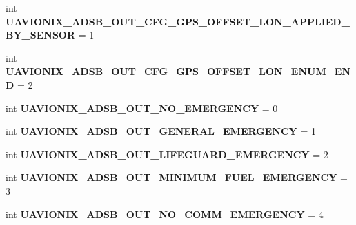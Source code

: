 \begin{DoxyCompactItemize}
\item 
\mbox{\label{namespacepymavlink_1_1dialects_1_1v10_acef78fcd3799630d3d422650b0805ff3}} 
int {\bfseries U\+A\+V\+I\+O\+N\+I\+X\+\_\+\+A\+D\+S\+B\+\_\+\+O\+U\+T\+\_\+\+C\+F\+G\+\_\+\+G\+P\+S\+\_\+\+O\+F\+F\+S\+E\+T\+\_\+\+L\+O\+N\+\_\+\+A\+P\+P\+L\+I\+E\+D\+\_\+\+B\+Y\+\_\+\+S\+E\+N\+S\+OR} = 1
\item 
\mbox{\label{namespacepymavlink_1_1dialects_1_1v10_a64ebfc328ccf04025fe31abab358d981}} 
int {\bfseries U\+A\+V\+I\+O\+N\+I\+X\+\_\+\+A\+D\+S\+B\+\_\+\+O\+U\+T\+\_\+\+C\+F\+G\+\_\+\+G\+P\+S\+\_\+\+O\+F\+F\+S\+E\+T\+\_\+\+L\+O\+N\+\_\+\+E\+N\+U\+M\+\_\+\+E\+ND} = 2
\item 
\mbox{\label{namespacepymavlink_1_1dialects_1_1v10_ac1f6b9dd7e0ba0b31433747322f29c20}} 
int {\bfseries U\+A\+V\+I\+O\+N\+I\+X\+\_\+\+A\+D\+S\+B\+\_\+\+O\+U\+T\+\_\+\+N\+O\+\_\+\+E\+M\+E\+R\+G\+E\+N\+CY} = 0
\item 
\mbox{\label{namespacepymavlink_1_1dialects_1_1v10_a76b759dd2eb10db602caa9d817833373}} 
int {\bfseries U\+A\+V\+I\+O\+N\+I\+X\+\_\+\+A\+D\+S\+B\+\_\+\+O\+U\+T\+\_\+\+G\+E\+N\+E\+R\+A\+L\+\_\+\+E\+M\+E\+R\+G\+E\+N\+CY} = 1
\item 
\mbox{\label{namespacepymavlink_1_1dialects_1_1v10_a82cf2057311f51b29bd3e5f69e49658b}} 
int {\bfseries U\+A\+V\+I\+O\+N\+I\+X\+\_\+\+A\+D\+S\+B\+\_\+\+O\+U\+T\+\_\+\+L\+I\+F\+E\+G\+U\+A\+R\+D\+\_\+\+E\+M\+E\+R\+G\+E\+N\+CY} = 2
\item 
\mbox{\label{namespacepymavlink_1_1dialects_1_1v10_a372199cefaf4d32dbaca2a3bb1b721b1}} 
int {\bfseries U\+A\+V\+I\+O\+N\+I\+X\+\_\+\+A\+D\+S\+B\+\_\+\+O\+U\+T\+\_\+\+M\+I\+N\+I\+M\+U\+M\+\_\+\+F\+U\+E\+L\+\_\+\+E\+M\+E\+R\+G\+E\+N\+CY} = 3
\item 
\mbox{\label{namespacepymavlink_1_1dialects_1_1v10_a7ece31dd9847ef6f31282af3895f391e}} 
int {\bfseries U\+A\+V\+I\+O\+N\+I\+X\+\_\+\+A\+D\+S\+B\+\_\+\+O\+U\+T\+\_\+\+N\+O\+\_\+\+C\+O\+M\+M\+\_\+\+E\+M\+E\+R\+G\+E\+N\+CY} = 4

\end{DoxyCompactItemize}
